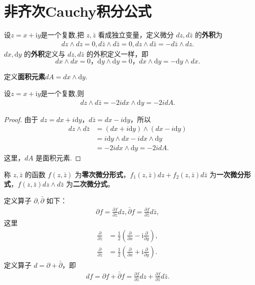 \documentclass[../../main.tex]{subfiles}
\begin{document}
\section{非齐次Cauchy积分公式}

\begin{definition}
设$z=x+\mathrm{i}y$是一个复数,把 \( z,\bar{z} \) 看成独立变量，定义微分 \( dz,d\bar{z} \) 的\textbf{外积}为
\begin{align*}
dz \wedge dz = 0, 
d\bar{z} \wedge d\bar{z} = 0, 
dz \wedge d\bar{z} = -d\bar{z} \wedge dz.
\end{align*}
\( dx,\mathrm{d}y \) 的\textbf{外积}定义与 \( dz,d\bar{z} \) 的外积定义一样，即 
\[
dx \wedge dx = 0 ， \mathrm{d}y \wedge \mathrm{d}y = 0 ， dx \wedge \mathrm{d}y = -\mathrm{d}y \wedge dx .
\]

定义\textbf{面积元素}\( dA =dx \wedge \mathrm{d}y .\) 
\end{definition}

\begin{proposition}
设$z=x+\mathrm{i}y$是一个复数,则
\begin{align*}
dz \wedge d\bar{z} = -2idx \wedge \mathrm{d}y = -2idA.
\end{align*}
\end{proposition}
\begin{proof}
由于 \( dz = dx + i\mathrm{d}y \)，\( d\bar{z} = dx - i\mathrm{d}y \)，所以
\begin{align*}
dz \wedge d\bar{z} &= (dx + i\mathrm{d}y) \wedge (dx - i\mathrm{d}y) \\
&= i\mathrm{d}y \wedge dx - idx \wedge \mathrm{d}y \\
&= -2idx \wedge \mathrm{d}y = -2idA.
\end{align*}
这里，\( dA \) 是面积元素.
\end{proof}

\begin{definition}
称 \( z,\bar{z} \) 的函数 \( f(z,\bar{z}) \) 为\textbf{零次微分形式}，\( f_1(z,\bar{z})dz + f_2(z,\bar{z})d\bar{z} \) 为\textbf{一次微分形式}，\( f(z,\bar{z})dz \wedge d\bar{z} \) 为\textbf{二次微分式}。
\end{definition}

\begin{definition}
定义算子 \( \partial,\bar{\partial} \) 如下：
\begin{align*}
\partial f = \frac{\partial f}{\partial z}dz, 
\bar{\partial} f = \frac{\partial f}{\partial \bar{z}}d\bar{z},
\end{align*}
这里
\begin{align*}
\frac{\partial}{\partial z} &= \frac{1}{2}\left( \frac{\partial}{\partial x} - \text{i}\frac{\partial}{\partial y} \right), \\
\frac{\partial}{\partial \overline{z}} &= \frac{1}{2}\left( \frac{\partial}{\partial x} + \text{i}\frac{\partial}{\partial y} \right).
\end{align*}
定义算子 \( d = \partial + \bar{\partial} \)，即
\begin{align}
df = \partial f + \bar{\partial} f = \frac{\partial f}{\partial z}dz + \frac{\partial f}{\partial \bar{z}}d\bar{z}. \label{eq:1}
\end{align}
\end{definition}
\end{document}

